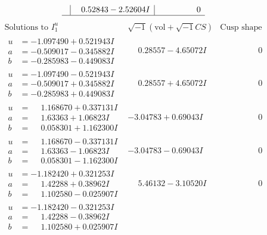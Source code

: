 \documentclass[1p]{elsarticle_modified}
\theoremstyle{definition}
\newcommand{\I}{\sqrt{-1}}
\begin{document}
$$\begin{array}{c|c|c}
 & \phantom{-}0.52843 - 2.52604 I & \phantom{-0.000000 } 0\\
 \hline 
 \end{array}$$\newpage$$\begin{array}{c|c|c}  
\text{Solutions to }I^u_{1}& \I (\text{vol} + \sqrt{-1}CS) & \text{Cusp shape}\\
 \hline 
\begin{aligned}
u &= -1.097490 + 0.521943 I \\
a &= -0.509017 - 0.345882 I \\
b &= -0.285983 - 0.449083 I\end{aligned}
 & \phantom{-}0.28557 - 4.65072 I & \phantom{-0.000000 } 0 \\ \hline\begin{aligned}
u &= -1.097490 - 0.521943 I \\
a &= -0.509017 + 0.345882 I \\
b &= -0.285983 + 0.449083 I\end{aligned}
 & \phantom{-}0.28557 + 4.65072 I & \phantom{-0.000000 } 0 \\ \hline\begin{aligned}
u &= \phantom{-}1.168670 + 0.337131 I \\
a &= \phantom{-}1.63363 + 1.06823 I \\
b &= \phantom{-}0.058301 + 1.162300 I\end{aligned}
 & -3.04783 + 0.69043 I & \phantom{-0.000000 } 0 \\ \hline\begin{aligned}
u &= \phantom{-}1.168670 - 0.337131 I \\
a &= \phantom{-}1.63363 - 1.06823 I \\
b &= \phantom{-}0.058301 - 1.162300 I\end{aligned}
 & -3.04783 - 0.69043 I & \phantom{-0.000000 } 0 \\ \hline\begin{aligned}
u &= -1.182420 + 0.321253 I \\
a &= \phantom{-}1.42288 + 0.38962 I \\
b &= \phantom{-}1.102580 - 0.025907 I\end{aligned}
 & \phantom{-}5.46132 - 3.10520 I & \phantom{-0.000000 } 0 \\ \hline\begin{aligned}
u &= -1.182420 - 0.321253 I \\
a &= \phantom{-}1.42288 - 0.38962 I \\
b &= \phantom{-}1.102580 + 0.025907 I\end{aligned}

\end{array}$$
\end{document}
